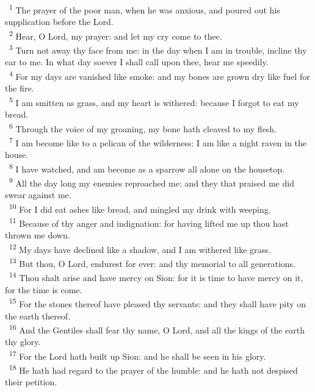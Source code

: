 \documentclass[a5paper,12pt]{article}
\begin{document}
\begin{multicols*}{2}
~\textsuperscript{1} The prayer of the poor man, when he was anxious, and poured out his supplication before the Lord.\\
~\textsuperscript{2} Hear, O Lord, my prayer: and let my cry come to thee.\\
~\textsuperscript{3} Turn not away thy face from me: in the day when I am in trouble, incline thy ear to me. In what day soever I shall call upon thee, hear me speedily.\\
~\textsuperscript{4} For my days are vanished like smoke: and my bones are grown dry like fuel for the fire.\\
~\textsuperscript{5} I am smitten as grass, and my heart is withered: because I forgot to eat my bread.\\
~\textsuperscript{6} Through the voice of my groaning, my bone hath cleaved to my flesh.\\
~\textsuperscript{7} I am become like to a pelican of the wilderness: I am like a night raven in the house.\\
~\textsuperscript{8} I have watched, and am become as a sparrow all alone on the housetop.\\
~\textsuperscript{9} All the day long my enemies reproached me: and they that praised me did swear against me.\\
~\textsuperscript{10} For I did eat ashes like bread, and mingled my drink with weeping.\\
~\textsuperscript{11} Because of thy anger and indignation: for having lifted me up thou hast thrown me down.\\
~\textsuperscript{12} My days have declined like a shadow, and I am withered like grass.\\
~\textsuperscript{13} But thou, O Lord, endurest for ever: and thy memorial to all generations.\\
~\textsuperscript{14} Thou shalt arise and have mercy on Sion: for it is time to have mercy on it, for the time is come.\\
~\textsuperscript{15} For the stones thereof have pleased thy servants: and they shall have pity on the earth thereof.\\
~\textsuperscript{16} And the Gentiles shall fear thy name, O Lord, and all the kings of the earth thy glory.\\
~\textsuperscript{17} For the Lord hath built up Sion: and he shall be seen in his glory.\\
~\textsuperscript{18} He hath had regard to the prayer of the humble: and he hath not despised their petition.\\

\end{multicols*}
\end{document}
